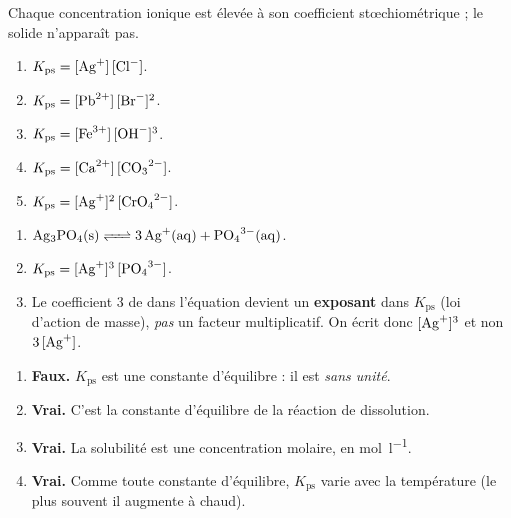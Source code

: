 \documentclass[11pt,a4paper]{article}
\begin{document}
\begin{corrige}
Chaque concentration ionique est élevée à son coefficient stœchiométrique ; le solide n'apparaît pas.
\begin{enumerate}[label=\alph*)]
  \item $K_{\mathrm{ps}} = [\ce{Ag+}]\,[\ce{Cl-}]$.
  \item $K_{\mathrm{ps}} = [\ce{Pb^{2+}}]\,[\ce{Br-}]^{2}$.
  \item $K_{\mathrm{ps}} = [\ce{Fe^{3+}}]\,[\ce{OH-}]^{3}$.
  \item $K_{\mathrm{ps}} = [\ce{Ca^{2+}}]\,[\ce{CO3^{2-}}]$.
  \item $K_{\mathrm{ps}} = [\ce{Ag+}]^{2}\,[\ce{CrO4^{2-}}]$.
\end{enumerate}
\end{corrige}

\begin{corrige}
\begin{enumerate}[label=\alph*)]
  \item $\ce{Ag3PO4(s) <=> 3 Ag^{+}(aq) + PO4^{3-}(aq)}$.
  \item $K_{\mathrm{ps}} = [\ce{Ag+}]^{3}\,[\ce{PO4^{3-}}]$.
  \item Le coefficient $3$ de  dans l'équation devient un \textbf{exposant} dans
        $K_{\mathrm{ps}}$ (loi d'action de masse), \emph{pas} un facteur multiplicatif. On écrit donc
        $[\ce{Ag+}]^{3}$ et non $3\,[\ce{Ag+}]$.
\end{enumerate}
\end{corrige}

\begin{corrige}
\begin{enumerate}[label=\alph*)]
  \item \textbf{Faux.} $K_{\mathrm{ps}}$ est une constante d'équilibre : il est \emph{sans unité}.
  \item \textbf{Vrai.} C'est la constante d'équilibre de la réaction de dissolution.
  \item \textbf{Vrai.} La solubilité est une concentration molaire, en \si{\mole\per\litre}.
  \item \textbf{Vrai.} Comme toute constante d'équilibre, $K_{\mathrm{ps}}$ varie avec la température
        (le plus souvent il augmente à chaud).
\end{enumerate}
\end{corrige}
\end{document}
